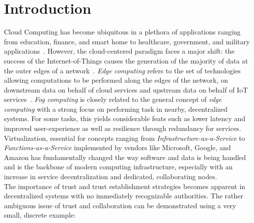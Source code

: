 \section{Introduction}
Cloud Computing has become ubiquitous in a plethora of applications ranging from education, finance, and smart home to healthcare, government, and military applications~\cite{cloudview,edge,fog,virtiot}. However, the cloud-centered paradigm faces a major shift: the success of the Internet-of-Things causes the generation of the majority of data at the outer edges of a network~\cite{edge,edgepromise,edge2}. \emph{Edge computing} refers to the set of technologies allowing computations to be performed along the edges of the network, on downstream data on behalf of cloud services and upstream data on behalf of IoT services~\cite{edge,edge2}. \emph{Fog computing} is closely related to the general concept of \emph{edge computing}\cite{fog, fog1, fog2} with a strong focus on performing task in nearby, decentralized systems. For some tasks, this yields considerable feats such as lower latency and improved user-experience as well as resilience through redundancy for services. Virtualization, essential for concepts ranging from \emph{Infrastructure-as-a-Service} to \emph{Functions-as-a-Service} implemented by vendors like Microsoft, Google, and Amazon has fundamentally changed the way software and data is being handled and is the backbone of modern computing infrastructure, especially with an increase in service decentralization and dedicated, collaborating nodes\cite{virtiot,edge,fog}.\\
The importance of trust and trust establishment strategies becomes apparent in decentralized systems with no immediately recognizable authorities. The rather ambiguous issue of trust and collaboration can be demonstrated using a very small, discrete example:\\
